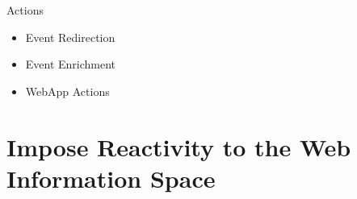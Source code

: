 


Actions
\begin{itemize}
  \item Event Redirection
  \item Event Enrichment
  \item WebApp Actions
\end{itemize}


\section{Impose Reactivity to the Web Information Space}












